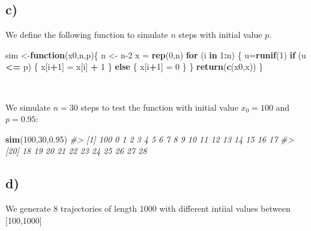 \documentclass[]{article}
\newenvironment{Shaded}{\begin{snugshade}}{\end{snugshade}}
\newcommand{\CommentTok}[1]{\textcolor[rgb]{0.56,0.35,0.01}{\textit{#1}}}
\newcommand{\ControlFlowTok}[1]{\textcolor[rgb]{0.13,0.29,0.53}{\textbf{#1}}}
\newcommand{\DecValTok}[1]{\textcolor[rgb]{0.00,0.00,0.81}{#1}}
\newcommand{\FloatTok}[1]{\textcolor[rgb]{0.00,0.00,0.81}{#1}}
\newcommand{\KeywordTok}[1]{\textcolor[rgb]{0.13,0.29,0.53}{\textbf{#1}}}
\newcommand{\NormalTok}[1]{#1}
\newcommand{\OperatorTok}[1]{\textcolor[rgb]{0.81,0.36,0.00}{\textbf{#1}}}
\newcommand{\StringTok}[1]{\textcolor[rgb]{0.31,0.60,0.02}{#1}}
\begin{document}
\hypertarget{c-1}{%
\subsection{c)}\label{c-1}}

We define the following function to simulate \(n\) steps with initial
value \(p\).

\begin{Shaded}
\begin{Highlighting}[]
\NormalTok{sim <-}\ControlFlowTok{function}\NormalTok{(x0,n,p)\{ }
\NormalTok{    n <-}\StringTok{ }\NormalTok{n}\DecValTok{-2}
\NormalTok{    x =}\StringTok{ }\KeywordTok{rep}\NormalTok{(}\DecValTok{0}\NormalTok{,n)}
    \ControlFlowTok{for}\NormalTok{ (i }\ControlFlowTok{in} \DecValTok{1}\OperatorTok{:}\NormalTok{n) \{}
\NormalTok{        u=}\KeywordTok{runif}\NormalTok{(}\DecValTok{1}\NormalTok{) }
        \ControlFlowTok{if}\NormalTok{ (u }\OperatorTok{<=}\StringTok{ }\NormalTok{p) \{}
\NormalTok{            x[i}\OperatorTok{+}\DecValTok{1}\NormalTok{] =}\StringTok{ }\NormalTok{x[i] }\OperatorTok{+}\StringTok{ }\DecValTok{1}
\NormalTok{        \} }\ControlFlowTok{else}\NormalTok{ \{}
\NormalTok{            x[i}\OperatorTok{+}\DecValTok{1}\NormalTok{] =}\StringTok{ }\DecValTok{0}
\NormalTok{        \}}
\NormalTok{    \} }
    \KeywordTok{return}\NormalTok{(}\KeywordTok{c}\NormalTok{(x0,x))}
\NormalTok{\}}
\end{Highlighting}
\end{Shaded}

~

We simulate \(n=30\) steps to test the function with initial value
\(x_{0} = 100\) and \(p=0.95\):

\begin{Shaded}
\begin{Highlighting}[]
\KeywordTok{sim}\NormalTok{(}\DecValTok{100}\NormalTok{,}\DecValTok{30}\NormalTok{,}\FloatTok{0.95}\NormalTok{)}
\CommentTok{#>  [1] 100   0   1   2   3   4   5   6   7   8   9  10  11  12  13  14  15  16  17}
\CommentTok{#> [20]  18  19  20  21  22  23  24  25  26  27  28}
\end{Highlighting}
\end{Shaded}

\hypertarget{d-1}{%
\subsection{d)}\label{d-1}}

We generate 8 trajectories of length 1000 with different intiial values
between {[}100,1000{]}
\end{document}
